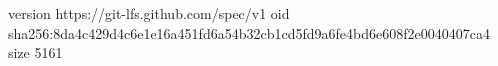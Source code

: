 version https://git-lfs.github.com/spec/v1
oid sha256:8da4c429d4c6e1e16a451fd6a54b32cb1cd5fd9a6fe4bd6e608f2e0040407ca4
size 5161
